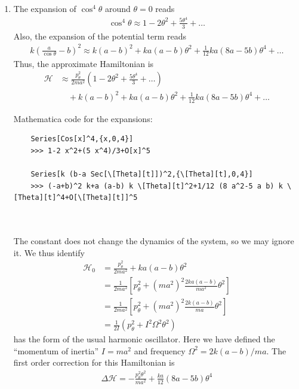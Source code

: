 \documentclass{article}
\theoremstyle{definition}
\newcommand{\ham}{\mathcal{H}}
\newcommand{\f}[2]{\frac{#1}{#2}}
\newcommand{\lp}{\left(}
\newcommand{\rp}{\right)}
\newcommand{\lb}{\left[}
\newcommand{\rb}{\right]}
\begin{document}
\begin{enumerate}[label=(\alph*)]
\begin{lstlisting}
	
	
	\end{lstlisting}
	
	\item The expansion of $\cos^4 \theta$ around $\theta = 0$ reads
	\begin{align*}
	\cos^4\theta \approx 1 -2\theta^2 + \f{5\theta^4}{3} + \dots 
	\end{align*} 
	Also, the expansion of the potential term reads
	\begin{align*}
	k \lp \f{a}{\cos\theta} - b \rp^2 \approx  k(a-b)^2 + ka(a-b)\theta^2 + \f{1}{12}ka(8a - 5b)\theta^4  + \dots
	\end{align*}
	Thus, the approximate Hamiltonian is 
	\begin{align*}
	\ham &\approx \f{p_\theta^2}{2ma^2}\lp  1 -2\theta^2 + \f{5\theta^4}{3} + \dots \rp \\
	&\quad+ k(a-b)^2 + ka(a-b)\theta^2 + \f{1}{12}ka(8a - 5b)\theta^4  + \dots
	\end{align*}
	
	Mathematica code for the expansions:
	\begin{lstlisting}
	Series[Cos[x]^4,{x,0,4}]
	>>> 1-2 x^2+(5 x^4)/3+O[x]^5
	
	Series[k (b-a Sec[\[Theta][t]])^2,{\[Theta][t],0,4}]
	>>> (-a+b)^2 k+a (a-b) k \[Theta][t]^2+1/12 (8 a^2-5 a b) k \[Theta][t]^4+O[\[Theta][t]]^5
	
	
	\end{lstlisting}
	
	
	The constant does not change the dynamics of the system, so we may ignore it. We thus identify 
	\begin{align*}
	\ham_0 
	&= \f{p_\theta^2}{2ma^2} + ka(a-b)\theta^2 \\
	&= \f{1}{2ma^2}\lb p_\theta^2 + (ma^2)^2 \f{2ka(a-b)}{ma^2}\theta^2  \rb\\
	&= \f{1}{2ma^2}\lb p_\theta^2 + (ma^2)^2 \f{2k(a-b)}{ma}\theta^2  \rb\\
	&= \boxed{\f{1}{2I}\lp p_\theta^2 + I^2 \Omega^2 \theta^2 \rp}
	\end{align*}
	has the form of the usual harmonic oscillator. Here we have defined the ``momentum of inertia'' $I = ma^2$ and frequency $\Omega^2 = 2k(a-b)/ma$. The first order correction for this Hamiltonian is 
	\begin{align*}
	\boxed{\Delta \ham = -\f{p_\theta^2\theta^2}{ma^2} + \f{ka}{12}(8a - 5b) \theta^4}
	\end{align*}


\end{enumerate}
\end{document}
